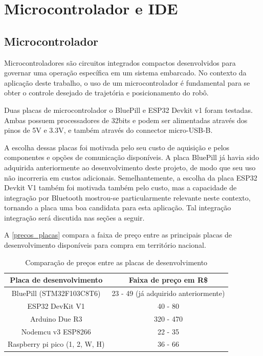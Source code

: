 
\section{Microcontrolador e IDE} \label{microcontrolador_ide}

\subsection{Microcontrolador}

Microcontroladores são circuitos integrados compactos desenvolvidos para governar
uma operação específica em um sistema embarcado. No contexto da aplicação deste
trabalho, o uso de um microcontrolador é fundamental para se obter o controle
desejado de trajetória e posicionamento do robô.

Duas placas de microcontrolador o BluePill e ESP32 Devkit v1 foram testadas.
Ambas possuem processadores de 32bits e podem ser alimentadas através dos pinos
de 5V e 3.3V, e também através do connector micro-USB-B.

A escolha dessas placas foi motivada pelo seu custo de aquisição e pelos
componentes e opções de comunicação disponíveis. A placa BluePill já havia sido
adquirida anteriormente ao desenvolvimento deste projeto, de modo que seu uso
não incorreria em custos adicionais. Semelhantemente, a escolha da placa ESP32
Devkit V1 também foi motivada também pelo custo, mas a capacidade de integração
por Bluetooth mostrou-se particularmente relevante neste contexto, tornando a
placa uma boa candidata para esta aplicação. Tal integração integração será
discutida nas seções a seguir.

A \autoref{precos_placas} compara a faixa de preço entre as principais
placas de desenvolvimento disponíveis para compra em território nacional.

\begin{table}[ht]
	\centering
	\caption{Comparação de preços entre as placas de desenvolvimento}
	 \begin{tabular}{|c|c|}
		\hline
		\textbf{Placa de desenvolvimento} & \textbf{Faixa de preço em R\$} \\ \hline
		BluePill (STM32F103C8T6) &  23 - 49 (já adquirido anteriormente) \\ \hline
		ESP32 DevKit V1  &  40 - 80   \\ \hline
		Arduino Due R3 &  320 - 470   \\ \hline
		Nodemcu v3 ESP8266 & 22 - 35   \\ \hline
		Raspberry pi pico (1, 2, W, H)  & 36 - 66  \\ \hline
	\end{tabular}
	\label{precos_placas}
\end{table}

